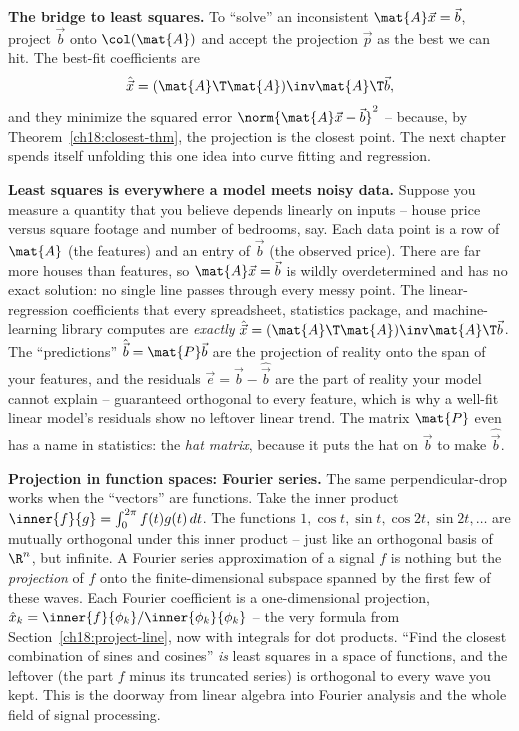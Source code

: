 \begin{focusbox}
\textbf{The bridge to least squares.} To ``solve'' an inconsistent $\mat{A}\vec{x}=\vec{b}$, project
$\vec{b}$ onto $\col(\mat{A})$ and accept the projection $\vec{p}$ as the best we can hit. The
best-fit coefficients are
\[
  \hat{\vec{x}} = (\mat{A}\T\mat{A})\inv\mat{A}\T\vec{b},
\]
and they minimize the squared error $\norm{\mat{A}\vec{x}-\vec{b}}^2$ -- because, by
Theorem~\ref{ch18:closest-thm}, the projection is the closest point. The next chapter spends itself
unfolding this one idea into curve fitting and regression.
\end{focusbox}

\begin{applicationbox}
\textbf{Least squares is everywhere a model meets noisy data.} Suppose you measure a quantity that
you believe depends linearly on inputs -- house price versus square footage and number of bedrooms,
say. Each data point is a row of $\mat{A}$ (the features) and an entry of $\vec{b}$ (the observed
price). There are far more houses than features, so $\mat{A}\vec{x}=\vec{b}$ is wildly
overdetermined and has no exact solution: no single line passes through every messy point. The
linear-regression coefficients that every spreadsheet, statistics package, and machine-learning
library computes are \emph{exactly} $\hat{\vec{x}}=(\mat{A}\T\mat{A})\inv\mat{A}\T\vec{b}$. The
``predictions'' $\hat{\vec{b}}=\mat{P}\vec{b}$ are the projection of reality onto the span of your
features, and the residuals $\vec{e}=\vec{b}-\hat{\vec{b}}$ are the part of reality your model
cannot explain -- guaranteed orthogonal to every feature, which is why a well-fit linear model's
residuals show no leftover linear trend. The matrix $\mat{P}$ even has a name in statistics: the
\emph{hat matrix}, because it puts the hat on $\vec{b}$ to make $\hat{\vec{b}}$.
\end{applicationbox}

\begin{connectionbox}
\textbf{Projection in function spaces: Fourier series.} The same perpendicular-drop works when the
``vectors'' are functions. Take the inner product $\inner{f}{g}=\int_0^{2\pi} f(t)g(t)\,dt$. The
functions $1,\cos t,\sin t,\cos 2t,\sin 2t,\dots$ are mutually orthogonal under this inner product
-- just like an orthogonal basis of $\R^n$, but infinite. A Fourier series approximation of a
signal $f$ is nothing but the \emph{projection} of $f$ onto the finite-dimensional subspace spanned
by the first few of these waves. Each Fourier coefficient is a one-dimensional projection,
$\hat{x}_k = \inner{f}{\phi_k}/\inner{\phi_k}{\phi_k}$ -- the very formula from
Section~\ref{ch18:project-line}, now with integrals for dot products. ``Find the closest combination
of sines and cosines'' \emph{is} least squares in a space of functions, and the leftover (the part
$f$ minus its truncated series) is orthogonal to every wave you kept. This is the doorway from
linear algebra into Fourier analysis and the whole field of signal processing.
\end{connectionbox}

